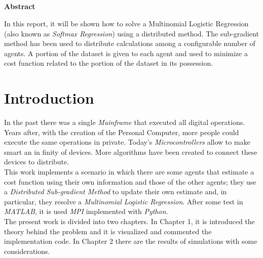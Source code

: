 \documentclass[a4paper,11pt,oneside]{book}
\begin{document}
\pagestyle{myheadings}



\newpage
\thispagestyle{empty}

\begin{center}
\chapter*{}
\thispagestyle{empty}
{\Huge \textbf{Abstract}}\\
\vspace{15mm}
\end{center}
In this report, it will be shown how to solve a Multinomial Logistic Regression (also known as \textit{Softmax Regression}) using a distributed method. The sub-gradient method has been used to distribute calculations among a configurable number of agents. A portion of the dataset is given to each agent and used to minimize a cost function related to the portion of the dataset in its possession.


\tableofcontents \thispagestyle{empty}
\listoffigures\thispagestyle{empty}

\chapter*{Introduction}
In the past there was a single \textit{Mainframe} that executed all digital operations. Years after, with the creation of the Personal Computer, more people could execute the same operations in private. Today's \textit{Microcontrollers} allow to make smart an in finity of devices. More algorithms have been created to connect these devices to distribute.\\
This work implements a scenario in which there are some agents that estimate a cost function using their own information and those of the other agents; they use a \textit{Distributed Sub-gradient Method} to update their own estimate and, in particular, they resolve a \textit{Multinomial Logistic Regression}. After some test in \textit{MATLAB}, it is used \textit{MPI} implemented with \textit{Python}.\\
The present work is divided into two chapters. In Chapter 1, it is introduced the theory behind the problem and it is visualized and commented the implementation code. In Chapter 2 there are the results of simulations with some considerations.
\end{document}
